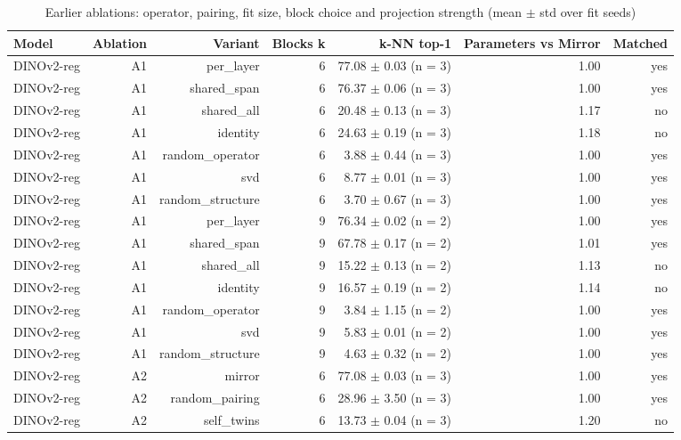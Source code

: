 \begin{table}[t]
\centering
\small
\caption{Earlier ablations: operator, pairing, fit size, block choice and projection strength (mean $\pm$ std over fit seeds)}
\label{tab:table3c_earlier_ablations}
\begin{tabular}{lrrrrrr}
\toprule
Model & Ablation & Variant & Blocks k & k-NN top-1 & Parameters vs Mirror & Matched \\
\midrule
DINOv2-reg & A1 & per\_layer & 6 & 77.08 $\pm$ 0.03 (n = 3) & 1.00 & yes \\
DINOv2-reg & A1 & shared\_span & 6 & 76.37 $\pm$ 0.06 (n = 3) & 1.00 & yes \\
DINOv2-reg & A1 & shared\_all & 6 & 20.48 $\pm$ 0.13 (n = 3) & 1.17 & no \\
DINOv2-reg & A1 & identity & 6 & 24.63 $\pm$ 0.19 (n = 3) & 1.18 & no \\
DINOv2-reg & A1 & random\_operator & 6 & 3.88 $\pm$ 0.44 (n = 3) & 1.00 & yes \\
DINOv2-reg & A1 & svd & 6 & 8.77 $\pm$ 0.01 (n = 3) & 1.00 & yes \\
DINOv2-reg & A1 & random\_structure & 6 & 3.70 $\pm$ 0.67 (n = 3) & 1.00 & yes \\
DINOv2-reg & A1 & per\_layer & 9 & 76.34 $\pm$ 0.02 (n = 2) & 1.00 & yes \\
DINOv2-reg & A1 & shared\_span & 9 & 67.78 $\pm$ 0.17 (n = 2) & 1.01 & yes \\
DINOv2-reg & A1 & shared\_all & 9 & 15.22 $\pm$ 0.13 (n = 2) & 1.13 & no \\
DINOv2-reg & A1 & identity & 9 & 16.57 $\pm$ 0.19 (n = 2) & 1.14 & no \\
DINOv2-reg & A1 & random\_operator & 9 & 3.84 $\pm$ 1.15 (n = 2) & 1.00 & yes \\
DINOv2-reg & A1 & svd & 9 & 5.83 $\pm$ 0.01 (n = 2) & 1.00 & yes \\
DINOv2-reg & A1 & random\_structure & 9 & 4.63 $\pm$ 0.32 (n = 2) & 1.00 & yes \\
DINOv2-reg & A2 & mirror & 6 & 77.08 $\pm$ 0.03 (n = 3) & 1.00 & yes \\
DINOv2-reg & A2 & random\_pairing & 6 & 28.96 $\pm$ 3.50 (n = 3) & 1.00 & yes \\
DINOv2-reg & A2 & self\_twins & 6 & 13.73 $\pm$ 0.04 (n = 3) & 1.20 & no \\

\end{tabular}
\end{table}
